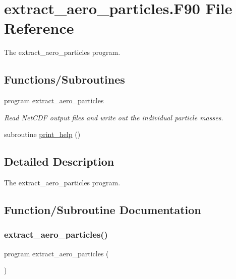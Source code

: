 \hypertarget{extract__aero__particles_8_f90}{}\section{extract\+\_\+aero\+\_\+particles.\+F90 File Reference}
\label{extract__aero__particles_8_f90}


The extract\+\_\+aero\+\_\+particles program.  


\subsection*{Functions/\+Subroutines}
\begin{DoxyCompactItemize}
\item 
program \mbox{\hyperlink{extract__aero__particles_8_f90_a0ab37a7f39b1e823b6acc126cc6959de}{extract\+\_\+aero\+\_\+particles}}
\begin{DoxyCompactList}\small\item\em Read Net\+C\+DF output files and write out the individual particle masses. \end{DoxyCompactList}\item 
subroutine \mbox{\hyperlink{extract__aero__particles_8_f90_a902971525680148df008f4a2800cb828}{print\+\_\+help}} ()
\end{DoxyCompactItemize}


\subsection{Detailed Description}
The extract\+\_\+aero\+\_\+particles program. 



\subsection{Function/\+Subroutine Documentation}
\mbox{\label{extract__aero__particles_8_f90_a0ab37a7f39b1e823b6acc126cc6959de}} 
\subsubsection{\texorpdfstring{extract\+\_\+aero\+\_\+particles()}{extract\_aero\_particles()}}
{\footnotesize\ttfamily program extract\+\_\+aero\+\_\+particles (\begin{DoxyParamCaption}{ }\end{DoxyParamCaption})}



